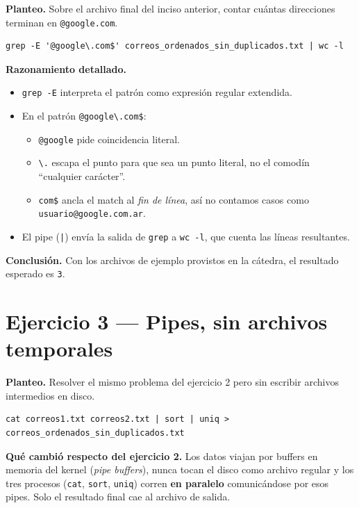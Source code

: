 \documentclass[11pt,a4paper]{article}
\begin{document}
\textbf{Planteo.} Sobre el archivo final del inciso anterior, contar
cuántas direcciones terminan en \texttt{@google.com}.

\begin{lstlisting}
grep -E '@google\.com$' correos_ordenados_sin_duplicados.txt | wc -l
\end{lstlisting}

\textbf{Razonamiento detallado.}
\begin{itemize}[leftmargin=*]
    \item \texttt{grep -E} interpreta el patrón como expresión regular
        extendida.
    \item En el patrón \texttt{@google\textbackslash.com\$}:
        \begin{itemize}[itemsep=0pt]
            \item \texttt{@google} pide coincidencia literal.
            \item \texttt{\textbackslash.} escapa el punto para que
                sea un punto literal, no el comodín ``cualquier
                carácter''.
            \item \texttt{com\$} ancla el match al \emph{fin de
                línea}, así no contamos casos como
                \texttt{usuario@google.com.ar}.
        \end{itemize}
    \item El pipe (\texttt{|}) envía la salida de \texttt{grep} a
        \texttt{wc -l}, que cuenta las líneas resultantes.
\end{itemize}

\textbf{Conclusión.} Con los archivos de ejemplo provistos en la
cátedra, el resultado esperado es \texttt{3}.

\section{Ejercicio 3 --- Pipes, sin archivos temporales}

\textbf{Planteo.} Resolver el mismo problema del ejercicio 2 pero sin
escribir archivos intermedios en disco.

\begin{lstlisting}
cat correos1.txt correos2.txt | sort | uniq > correos_ordenados_sin_duplicados.txt
\end{lstlisting}

\textbf{Qué cambió respecto del ejercicio 2.}
Los datos viajan por buffers en memoria del kernel (\emph{pipe
buffers}), nunca tocan el disco como archivo regular y los tres
procesos (\texttt{cat}, \texttt{sort}, \texttt{uniq}) corren
\textbf{en paralelo} comunicándose por esos pipes. Solo el resultado
final cae al archivo de salida.
\end{document}
